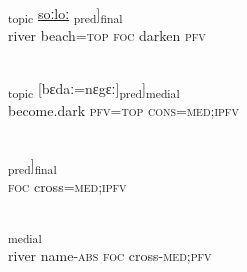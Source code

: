 \documentclass[output=paper]{LSP/langsci}
\begin{document}
\begin{appendixexe}
 \ex \label{Aiex:App49}
\gll [[haːnɛ	sɛː=jaː]\textsubscript{topic}	\underline{\smash{[kaː}}	\underline{soːloː}	\underline{\smash{di]}}\textsubscript{pred}]\textsubscript{final}\\
river	beach=\textsc{top}	\textsc{foc}	darken	\textsc{pfv}\\
\glt {}\\
\end{appendixexe}

\begin{appendixexe}
 \ex \label{Aiex:App50}
\gll [[\textbf{[soːlo}	\textbf{di=jaː]}\textsubscript{pred}]\textsubscript{topic}	[bɛdaː=nɛgɛː]\textsubscript{pred}]\textsubscript{medial}\\
become.dark	\textsc{pfv}=\textsc{top}	\textsc{cons}=\textsc{med};\textsc{ipfv}\\
\glt {}\\
\end{appendixexe}

\begin{appendixexe}
 \ex \label{Aiex:App51}
\gll \underline{\smash{[[kaː}}	\underline{\smash{taː=nɛgɛː]}}\textsubscript{pred}]\textsubscript{final}\\
\textsc{foc}	cross=\textsc{med;ipfv}\\
\glt {}\\
\end{appendixexe}

\begin{appendixexe}
 \ex \label{Aiex:App52}
\textsubscript{medial}\\
river	name-\textsc{abs}	\textsc{foc}	cross-\textsc{med};\textsc{pfv}\\
\glt {}\\
\end{appendixexe}
\end{document}
